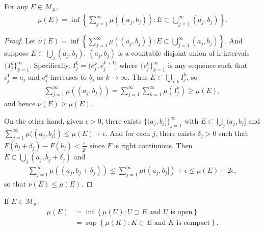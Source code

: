 \begin{lemma}
    For any $E \in \mathcal{M}_{\mu}$, 
    \begin{align}
        \mu(E) = \inf \left\{ \sum_{j=1}^{\infty} \mu((a_j, b_j)): E \subset \bigcup_{j=1}^{\infty} (a_j, b_j) \right\}.
    \end{align}
\end{lemma}

\begin{proof}
    Let $\nu(E) = \inf \left\{ \sum_{j=1}^{\infty} \mu ((a_j, b_j)): E \subset \bigcup_{j=1}^{\infty} (a_j, b_j) \right\}$.
    And suppose $E \subset \bigcup_{j} (a_j, b_j)$.
    $(a_j, b_j)$ is a countable disjoint union of h-intervals $\{ I_{j}^{k} \}_{k=1}^{\infty}$.
    Specifically, $I_{j}^{k} = (c_{j}^{k}, c_{j}^{k+1}]$ where $\{ c_{j}^{k} \}_{k=1}^{\infty}$ is any sequence such that $c_{j}^{1} = a_j$ and $c_{j}^{k}$ increases to $b_j$ as $k \to \infty$.
    Thus $E \subset \bigcup_{j,k} I_{j}^{k}$, so
    \begin{align}
        \sum_{j=1}^{\infty} \mu ((a_j, b_j)) = \sum_{j=1}^{\infty} \sum_{k=1}^{\infty} \mu(I_{j}^{k}) \ge \mu(E),
    \end{align}
    and hence $\nu(E) \ge \mu(E)$.

    On the other hand, given $\epsilon > 0$, there exists $\{ (a_j, b_j] \}_{j=1}^{\infty}$ with $E \subset \bigcup_{j} (a_j, b_j]$ and $\sum_{j=1}^{\infty} \mu((a_j, b_j]) \le \mu(E) + \epsilon$.
    And for each $j$, there exists $\delta_j > 0$ such that $F(b_j + \delta_j) - F(b_j) < \frac{\epsilon}{2^j}$ since $F$ is right continuous.
    Then $E \subset \bigcup_{j} (a_j, b_j + \delta_j)$ and 
    \begin{align}
        \sum_{j=1}^{\infty} \mu((a_j, b_j + \delta_j)) \le \sum_{j=1}^{\infty} \mu((a_j, b_j]) + \epsilon \le \mu(E) + 2 \epsilon,
    \end{align}
    so that $\nu(E) \le \mu(E)$.
\end{proof}

\begin{theorem}
    If $E \in \mathcal{M}_{\mu}$, 
    \begin{align}
        \mu(E) &= \inf \left\{ \mu(U): U \supset E \text{ and } U \text{ is open} \right\} \\
        &= \sup \left\{ \mu(K): K \subset E \text{ and } K \text{ is compact} \right\}.
    \end{align}
\end{theorem}


